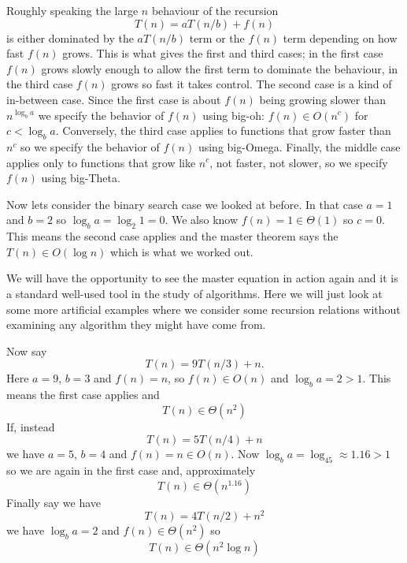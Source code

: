 \documentclass[11pt,a4paper]{scrartcl}
\begin{document}
Roughly speaking the large $n$ behaviour of the recursion
\begin{equation}
T(n)=aT(n/b)+f(n)
\end{equation}
is either dominated by the $aT(n/b)$ term or the $f(n)$ term depending
on how fast $f(n)$ grows. This is what gives the first and third
cases; in the first case $f(n)$ grows slowly enough to allow the first
term to dominate the behaviour, in the third case $f(n)$ grows so fast
it takes control. The second case is a kind of in-between case. Since
the first case is about $f(n)$ being growing slower than $n^{\log_ba}$
we specify the behavior of $f(n)$ using big-oh: $f(n)\in O(n^c)$ for
$c<\log_ba$. Conversely, the third case applies to functions that grow
faster than $n^c$ so we specify the behavior of $f(n)$ using
big-Omega. Finally, the middle case applies only to functions that
grow like $n^c$, not faster, not slower, so we specify $f(n)$ using big-Theta.

Now lets consider the binary search case we looked at before. In that case
$a=1$ and $b=2$ so $\log_ba=\log_2 1=0$. We also know $f(n)=1\in \Theta(1)$
so $c=0$. This means the second case applies and the master theorem
says the $T(n)\in O(\log n)$ which is what we worked out.

We will have the opportunity to see the master equation in action
again and it is a standard well-used tool in the study of
algorithms. Here we will just look at some more artificial examples
where we consider some recursion relations without examining any
algorithm they might have come from. 

Now say
\begin{equation}
T(n)=9T(n/3)+n.
\end{equation}
Here $a=9$, $b=3$ and $f(n)=n$, so $f(n)\in O(n)$ and $\log_ba=2>1$. This means the first case applies and
\begin{equation}
T(n)\in \Theta(n^2)
\end{equation}
If, instead
\begin{equation}
T(n)=5T(n/4)+n
\end{equation}
we have $a=5$, $b=4$ and $f(n)=n\in O(n)$. Now $\log_ba=\log_45\approx 1.16>1$ so we are again in the first case and, approximately 
\begin{equation}
T(n)\in \Theta(n^{1.16})
\end{equation}
Finally say we have
\begin{equation}
T(n)=4T(n/2)+n^2
\end{equation}
we have $\log_ba=2$ and $f(n)\in \Theta(n^2)$ so
\begin{equation}
T(n)\in \Theta(n^2\log n)
\end{equation}
\end{document}
